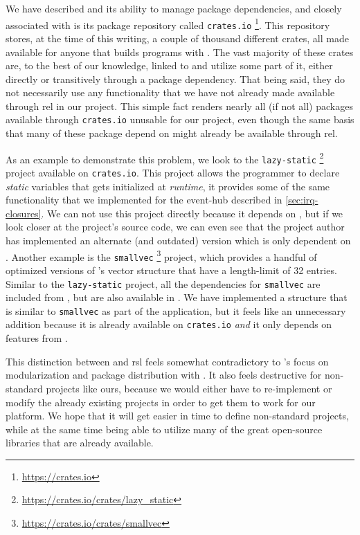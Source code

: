 We have described {\cargo} and its ability to manage package dependencies, and closely associated with {\cargo} is its package repository called \texttt{crates.io} \footnote{\url{https://crates.io}}.
This repository stores, at the time of this writing, a couple of thousand different {\rust} crates, all made available for anyone that builds {\rust} programs with {\cargo}.
The vast majority of these crates are, to the best of our knowledge, linked to {\std} and utilize some part of it, either directly or transitively through a package dependency.
That being said, they do not necessarily use any functionality that we have not already made available through \gls{rel} in our project.
This simple fact renders nearly all (if not all) packages available through \texttt{crates.io} unusable for our project, even though the same basis that many of these package depend on might already be available through \gls{rel}.

As an example to demonstrate this problem, we look to the \texttt{lazy-static} \footnote{\url{https://crates.io/crates/lazy_static}} project available on \texttt{crates.io}.
This project allows the programmer to declare \emph{static} variables that gets initialized at \emph{runtime}, it provides some of the same functionality that we implemented for the event-hub described in \autoref{sec:irq-closures}.
We can not use this project directly because it depends on {\std}, but if we look closer at the project's source code, we can even see that the project author has implemented an alternate (and outdated) version which is only dependent on {\core}.
Another example is the \texttt{smallvec} \footnote{\url{https://crates.io/crates/smallvec}} project, which provides a handful of optimized versions of {\rust}'s vector structure that have a length-limit of 32 entries.
Similar to the \texttt{lazy-static} project, all the dependencies for \texttt{smallvec} are included from {\std}, but are also available in {\core}.
We have implemented a structure that is similar to \texttt{smallvec} as part of the {\tracker} application, but it feels like an unnecessary addition because it is already available on \texttt{crates.io} \emph{and} it only depends on features from {\core}.

This distinction between {\std} and \gls{rsl} feels somewhat contradictory to {\rust}'s focus on modularization and package distribution with {\cargo}.
It also feels destructive for non-standard projects like ours, because we would either have to re-implement or modify the already existing projects in order to get them to work for our platform.
We hope that it will get easier in time to define non-standard projects, while at the same time being able to utilize many of the great open-source libraries that are already available.
